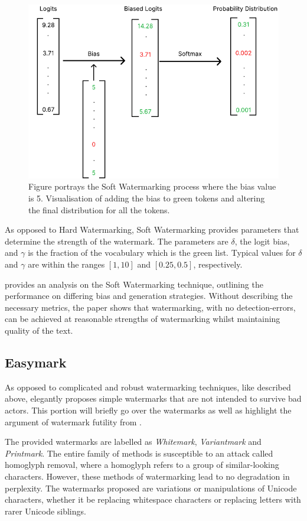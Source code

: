 \documentclass{l4proj}
\theoremstyle{definition}
\begin{document}
        \begin{figure}
            \centering
            \includegraphics[width=0.5\linewidth, keepaspectratio]{images/background/biasing-process.pdf}
            \caption{Figure portrays the Soft Watermarking process where the bias value is 5. Visualisation of adding the bias to green tokens and altering the final distribution for all the tokens.}
            \label{fig:soft-watermarking-process}
        \end{figure}

        As opposed to Hard Watermarking, Soft Watermarking provides parameters that determine the strength of the watermark. The parameters are $\delta$, the logit bias, and $\gamma$ is the fraction of the vocabulary which is the green list. Typical values for $\delta$ and $\gamma$ are within the ranges $[1, 10]$ and $[0.25, 0.5]$, respectively.

        \citet{kirchenbauer2023watermark} provides an analysis on the Soft Watermarking technique, outlining the performance on differing bias and generation strategies. Without describing the necessary metrics, the paper shows that watermarking, with no detection-errors, can be achieved at reasonable strengths of watermarking whilst maintaining quality of the text.
        
    \subsection{Easymark}
        \label{sec:easymark}
        As opposed to complicated and robust watermarking techniques, like described above, \citet{sato2023embarrassingly} elegantly proposes simple watermarks that are not intended to survive bad actors. This portion will briefly go over the watermarks as well as highlight the argument of watermark futility from \citet{sato2023embarrassingly}.

        The provided watermarks are labelled as \emph{Whitemark}, \emph{Variantmark} and \emph{Printmark}. The entire family of methods is susceptible to an attack called homoglyph removal, where a homoglyph refers to a group of similar-looking characters. However, these methods of watermarking lead to no degradation in perplexity. The watermarks proposed are variations or manipulations of Unicode characters, whether it be replacing whitespace characters or replacing letters with rarer Unicode siblings.
\end{document}
